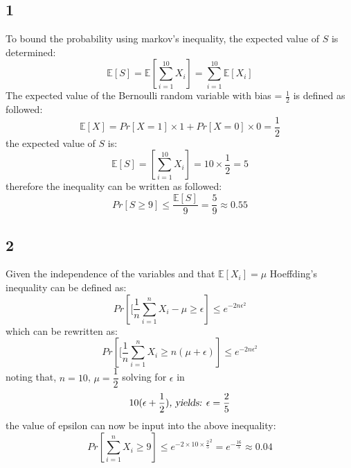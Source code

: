 \documentclass{article}
\begin{document}
\subsection{1}
To bound the probability using markov's inequality, the expected value of $S$ is determined:\\
\begin{equation*}
\mathbb{E}[S] = \mathbb{E} \left[\sum\limits^{10}_{i=1}X_i\right] = \sum\limits^{10}_{i=1} \mathbb{E}[X_i]
\end{equation*}
The expected value of the Bernoulli random variable with bias = $\frac{1}{2}$ is defined as followed:
\begin{equation*}
\mathbb{E}[X] = Pr[X=1] \times 1 + Pr[X=0] \times 0 = \dfrac{1}{2}
\end{equation*}
the expected value of $S$ is:
\begin{equation*}
\mathbb{E}[S]= \left[\sum\limits^{10}_{i=1}X_i\right] = 10 \times \dfrac{1}{2} = 5
\end{equation*}
therefore the inequality can be written as followed:
\begin{equation*}
Pr[S \geq 9] \leq \dfrac{\mathbb{E}[S]}{9} = \dfrac{5}{9} \approx 0.55
\end{equation*}
\subsection{2}
Given the independence of the variables and that $ \mathbb{E}[X_i] = \mu $
Hoeffding's inequality can be defined as:
\begin{equation*}
Pr\left[ [ \dfrac{1}{n} \sum\limits^{n}_{i=1}X_i - \mu \geq \epsilon \right]
\leq e^{-2n\epsilon^2}
\end{equation*}
which can be rewritten as:
\begin{equation*}
Pr\left[ [ \dfrac{1}{n} \sum\limits^{n}_{i=1}X_i \geq n(\mu + \epsilon) \right]
\leq e^{-2n\epsilon^2}
\end{equation*}
noting that, $n=10$, $\mu= \dfrac{1}{2}$ solving for $\epsilon$ in\\
$$ 10(\epsilon+ \dfrac{1}{2}) \textsl{, yields: } \epsilon=\dfrac{2}{5} $$
the value of epsilon can now be input into the above inequality:
\begin{equation*}
Pr \left[ \sum\limits^{n}_{i=1}X_i \geq 9 \right] \leq e^{-2 \times 10 \times \frac{2}{5}^2} = e^{-\frac{16}{5}}  \approx 0.04
\end{equation*}
\end{document}
